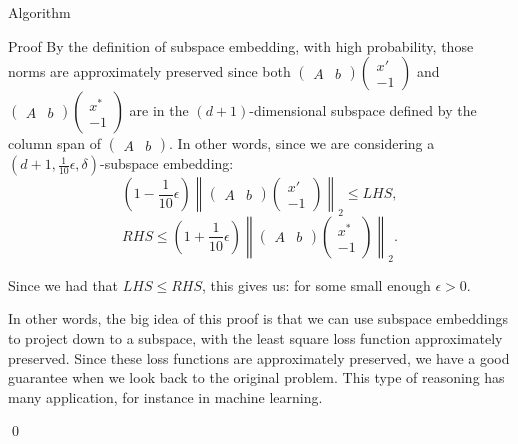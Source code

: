 \documentclass[a4paper]{article}
\begin{document}
\begin{parag}{Algorithm}
\begin{subparag}{Proof}
        By the definition of subspace embedding, with high probability, those norms are approximately preserved since both $\begin{pmatrix} A & b \end{pmatrix} \begin{pmatrix} x' \\ -1 \end{pmatrix}$ and $\begin{pmatrix} A & b \end{pmatrix} \begin{pmatrix} x^* \\ -1 \end{pmatrix}$ are in the $\left(d+1\right)$-dimensional subspace defined by the column span of $\begin{pmatrix} A & b \end{pmatrix}$. In other words, since we are considering a $\left(d+1, \frac{1}{10} \epsilon, \delta\right)$-subspace embedding: 
        \[\left(1-\frac{1}{10}\epsilon\right) \left\|\begin{pmatrix} A & b \end{pmatrix} \begin{pmatrix} x' \\ -1 \end{pmatrix} \right\|_2 \leq LHS,\]
        \[RHS \leq \left(1+\frac{1}{10}\epsilon\right) \left\|\begin{pmatrix} A & b \end{pmatrix} \begin{pmatrix} x^* \\ -1 \end{pmatrix} \right\|_2.\]
        
        Since we had that $LHS \leq RHS$, this gives us:
        for some small enough $\epsilon > 0$.

        In other words, the big idea of this proof is that we can use subspace embeddings to project down to a subspace, with the least square loss function approximately preserved. Since these loss functions are approximately preserved, we have a good guarantee when we look back to the original problem. This type of reasoning has many application, for instance in machine learning.

        \qed
    \end{subparag}
\end{parag}
\end{document}
